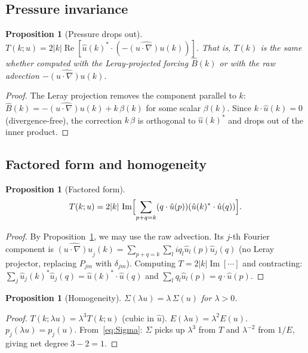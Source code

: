 \documentclass[11pt]{article}
\newtheorem{proposition}[theorem]{Proposition}
\theoremstyle{definition}
\DeclareMathOperator{\re}{Re}
\DeclareMathOperator{\im}{Im}
\begin{document}
\subsection{Pressure invariance}

\begin{proposition}[Pressure drops out]
\label{prop:pressure}
$T(k;u) = 2|k|\re[\hat u(k)^*\cdot
(-\widehat{(u\cdot\nabla)u}(k))]$.
That is, $T(k)$ is the same whether computed with the
Leray-projected forcing $\hat B(k)$ or with the raw
advection $-\widehat{(u\cdot\nabla)u}(k)$.
\end{proposition}

\begin{proof}
The Leray projection removes the component parallel
to $k$:
$\hat B(k) = -\widehat{(u\cdot\nabla)u}(k)
+ k\,\beta(k)$
for some scalar $\beta(k)$.  Since $k\cdot\hat u(k)=0$
(divergence-free), the correction $k\,\beta$ is
orthogonal to $\hat u(k)^*$ and drops out of the
inner product.
\end{proof}

\subsection{Factored form and homogeneity}

\begin{proposition}[Factored form]
\label{prop:factored}
\begin{equation}\label{eq:factored}
T(k;u) = 2|k|\,\im\Bigl[
\sum_{p+q=k}(q\cdot\hat u(p))(\hat u(k)^*\cdot\hat u(q))
\Bigr].
\end{equation}
\end{proposition}

\begin{proof}
By Proposition~\ref{prop:pressure}, we may use the raw
advection.  Its $j$-th Fourier component is
$\widehat{(u\cdot\nabla)u}_j(k)
= \sum_{p+q=k}\sum_l iq_l\hat u_l(p)\hat u_j(q)$
(no Leray projector, replacing $P_{jm}$ with $\delta_{jm}$).
Computing $T = 2|k|\im[\cdots]$ and contracting:
$\sum_j \hat u_j(k)^*\hat u_j(q) = \hat u(k)^*\cdot\hat u(q)$
and
$\sum_l q_l\hat u_l(p) = q\cdot\hat u(p)$.
\end{proof}

\begin{proposition}[Homogeneity]
\label{prop:homog}
$\Sigma(\lambda u) = \lambda\,\Sigma(u)$ for $\lambda>0$.
\end{proposition}

\begin{proof}
$T(k;\lambda u) = \lambda^3 T(k;u)$ (cubic in $\hat u$).
$E(\lambda u) = \lambda^2 E(u)$.  $p_j(\lambda u)=p_j(u)$.
From~\eqref{eq:Sigma}: $\Sigma$ picks up $\lambda^3$
from $T$ and $\lambda^{-2}$ from $1/E$, giving
net degree $3-2=1$.
\end{proof}
\end{document}
